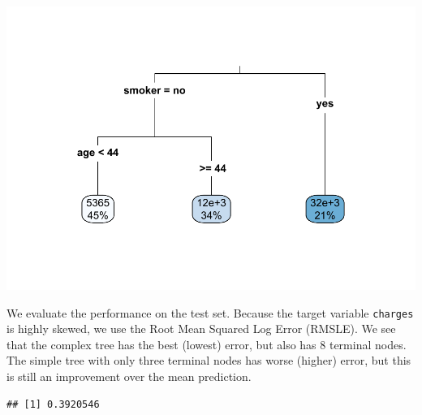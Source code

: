 \documentclass[openany]{book}
\newenvironment{Shaded}{\begin{snugshade}}{\end{snugshade}}
\newcommand{\ControlFlowTok}[1]{\textcolor[rgb]{0.13,0.29,0.53}{\textbf{#1}}}
\newcommand{\DecValTok}[1]{\textcolor[rgb]{0.00,0.00,0.81}{#1}}
\newcommand{\KeywordTok}[1]{\textcolor[rgb]{0.13,0.29,0.53}{\textbf{#1}}}
\newcommand{\NormalTok}[1]{#1}
\newcommand{\OperatorTok}[1]{\textcolor[rgb]{0.81,0.36,0.00}{\textbf{#1}}}
\newcommand{\StringTok}[1]{\textcolor[rgb]{0.31,0.60,0.02}{#1}}
\begin{document}
\includegraphics{06-tree-based-models_files/figure-latex/unnamed-chunk-9-1.pdf}

We evaluate the performance on the test set. Because the target variable \texttt{charges} is highly skewed, we use the Root Mean Squared Log Error (RMSLE). We see that the complex tree has the best (lowest) error, but also has 8 terminal nodes. The simple tree with only three terminal nodes has worse (higher) error, but this is still an improvement over the mean prediction.

\begin{Shaded}
\end{Shaded}

\begin{verbatim}
## [1] 0.3920546
\end{verbatim}

\begin{Shaded}
\end{Shaded}
\end{document}
